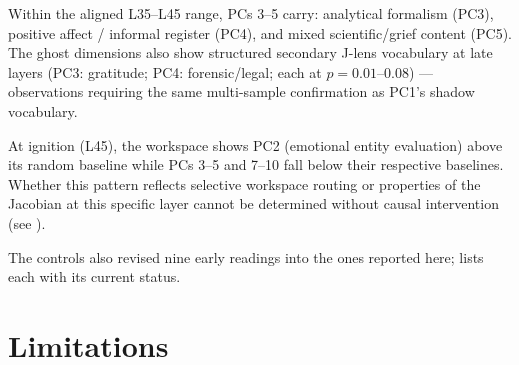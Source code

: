 \documentclass[11pt,a4paper]{article}
\begin{document}
Within the aligned L35--L45 range, PCs 3--5 carry: analytical formalism (PC3), positive affect / informal register (PC4), and mixed scientific/grief content (PC5). The ghost dimensions also show structured secondary J-lens vocabulary at late layers (PC3: gratitude; PC4: forensic/legal; each at $p = 0.01$--$0.08$) --- observations requiring the same multi-sample confirmation as PC1's shadow vocabulary.

At ignition (L45), the workspace shows PC2 (emotional entity evaluation) above its random baseline while PCs 3--5 and 7--10 fall below their respective baselines. Whether this pattern reflects selective workspace routing or properties of the Jacobian at this specific layer cannot be determined without causal intervention (see ).

The controls also revised nine early readings into the ones reported here;  lists each with its current status.

\section{Limitations}
\label{sec:limitations}
\end{document}
